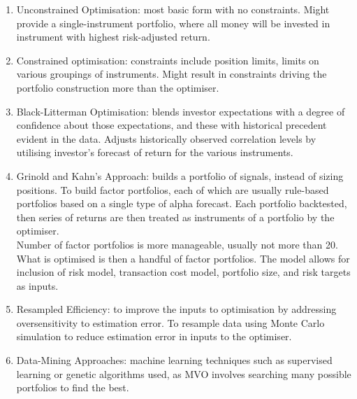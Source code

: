 \documentclass[a4paper,oneside,openany]{book}
\begin{document}
\begin{method} 
\begin{enumerate}[label=\roman*.]
\setlength{\itemsep}{0pt}
\item Unconstrained Optimisation: most basic form with no constraints. Might provide a single-instrument portfolio, where all money will be invested in instrument with highest risk-adjusted return.
\item Constrained optimisation: constraints include position limits, limits on various groupings of instruments. Might result in constraints driving the portfolio construction more than the optimiser.
\item Black-Litterman Optimisation: blends investor expectations with a degree of confidence about those expectations, and these with historical precedent evident in the data. Adjusts historically observed correlation levels by utilising investor's forecast of return for the various instruments.
\item Grinold and Kahn's Approach: builds a portfolio of signals, instead of sizing positions. To build factor portfolios, each of which are usually rule-based portfolios based on a single type of alpha forecast. Each portfolio backtested, then series of returns are then treated as instruments of a portfolio by the optimiser.\\
Number of factor portfolios is more manageable, usually not more than 20. What is optimised is then a handful of factor portfolios. The model allows for inclusion of risk model, transaction cost model, portfolio size, and risk targets as inputs.
\item Resampled Efficiency: to improve the inputs to optimisation by addressing oversensitivity to estimation error. To resample data using Monte Carlo simulation to reduce estimation error in inputs to the optimiser.
\item Data-Mining Approaches: machine learning techniques such as supervised learning or genetic algorithms used, as MVO involves searching many possible portfolios to find the best.
\end{enumerate}
\end{method}
\end{document}

